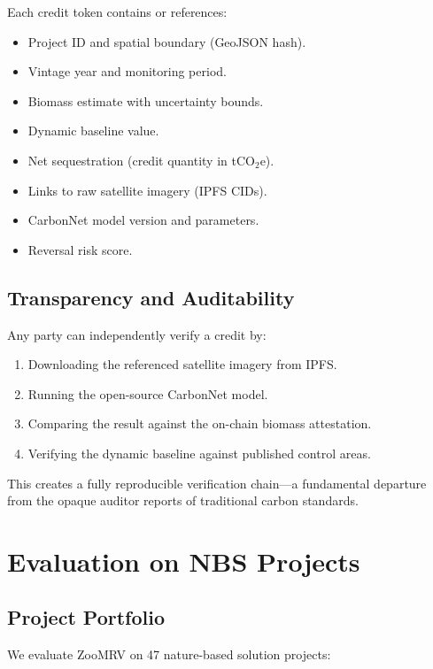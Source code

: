 \documentclass[11pt,a4paper]{article}
\newcommand{\tCO}{tCO$_2$e}
\begin{document}
Each credit token contains or references:
\begin{itemize}
  \item Project ID and spatial boundary (GeoJSON hash).
  \item Vintage year and monitoring period.
  \item Biomass estimate with uncertainty bounds.
  \item Dynamic baseline value.
  \item Net sequestration (credit quantity in \tCO{}).
  \item Links to raw satellite imagery (IPFS CIDs).
  \item CarbonNet model version and parameters.
  \item Reversal risk score.
\end{itemize}

\subsection{Transparency and Auditability}

Any party can independently verify a credit by:
\begin{enumerate}
  \item Downloading the referenced satellite imagery from IPFS.
  \item Running the open-source CarbonNet model.
  \item Comparing the result against the on-chain biomass attestation.
  \item Verifying the dynamic baseline against published control areas.
\end{enumerate}

This creates a fully reproducible verification chain---a fundamental
departure from the opaque auditor reports of traditional carbon
standards.


\section{Evaluation on NBS Projects}
\label{sec:evaluation}

\subsection{Project Portfolio}

We evaluate ZooMRV on 47 nature-based solution projects:
\end{document}
